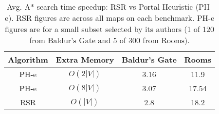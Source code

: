 \begin{table}[tb]
\begin{center}
\begin{tabular}{|c|c|c|c|}
\hline
\textbf{Algorithm} & \textbf{Extra Memory} & \textbf{Baldur's Gate} & \textbf{Rooms}  \\ \hline
PH-e & $O(2|V|)$ & 3.16 &  11.9 \\ \hline
PH-e & $O(8|V|)$ & 3.07 &  17.54 \\ \hline
RSR & $O(|V|)$ & 2.8 & 18.2 \\ \hline
\end{tabular}
\end{center}
\caption{Avg. A* search time speedup: RSR vs Portal Heuristic (PH-e).
RSR figures are across all maps on each benchmark. 
PH-e figures are for a small subset selected by its authors (1 of 120 from
Baldur's Gate and 5 of 300 from Rooms). }
\label{table-phspeedup}
\end{table}
